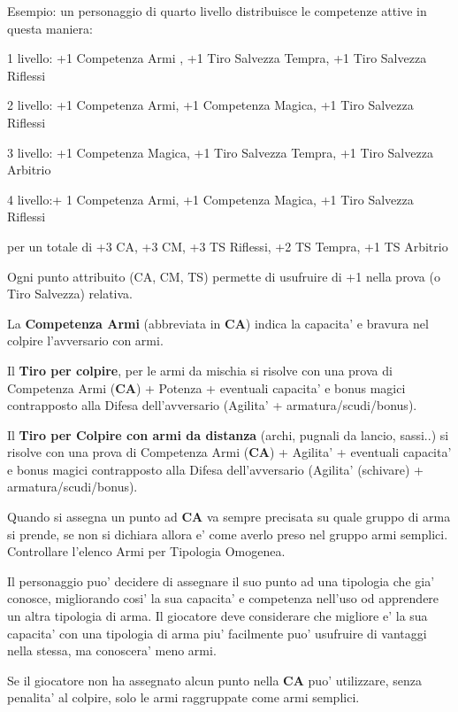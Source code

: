 \documentclass[a4paper,11pt,twoside,openany]{book}
\begin{document}
\bigskip

Esempio: un personaggio di quarto livello distribuisce le competenze
attive in questa maniera:

1 livello: +1 Competenza Armi , +1 Tiro Salvezza Tempra, +1 Tiro Salvezza Riflessi

2 livello: +1 Competenza Armi, +1 Competenza Magica, +1 Tiro Salvezza Riflessi

3 livello: +1 Competenza Magica, +1 Tiro Salvezza Tempra, +1 Tiro Salvezza Arbitrio

4 livello:+ 1 Competenza Armi, +1 Competenza Magica, +1 Tiro Salvezza Riflessi

per un totale di +3 CA, +3 CM, +3 TS Riflessi, +2 TS Tempra, +1 TS Arbitrio

\bigskip

Ogni punto attribuito (CA, CM, TS) permette di usufruire di +1 nella prova (o Tiro Salvezza) relativa.

La \textbf{Competenza Armi} (abbreviata in \textbf{CA}) indica la capacita' e bravura nel colpire l'avversario con armi.

Il \textbf{Tiro per colpire}, per le armi da mischia si risolve con una prova di Competenza Armi (\textbf{CA}) + Potenza + eventuali capacita' e bonus magici contrapposto alla Difesa dell'avversario (Agilita' + armatura/scudi/bonus).

Il \textbf{Tiro per Colpire con armi da distanza} (archi, pugnali da lancio, sassi..) si risolve con una prova di Competenza Armi (\textbf{CA}) + Agilita' + eventuali capacita' e bonus magici contrapposto alla Difesa dell'avversario (Agilita' (schivare) + armatura/scudi/bonus).

Quando si assegna un punto ad \textbf{CA} va sempre precisata su quale gruppo di arma si prende, se non si dichiara allora e' come averlo preso nel gruppo armi semplici.
Controllare l'elenco Armi per Tipologia Omogenea.

Il personaggio puo' decidere di assegnare il suo punto ad una tipologia che gia' conosce, migliorando cosi' la sua capacita' e competenza nell'uso od apprendere un altra tipologia di arma. 
Il giocatore deve considerare che migliore e' la sua capacita' con una tipologia di arma piu' facilmente puo' usufruire di vantaggi nella stessa, ma conoscera' meno armi.

Se il giocatore non ha assegnato alcun punto nella \textbf{CA} puo' utilizzare, senza penalita' al colpire, solo le armi raggruppate come armi semplici.
\end{document}

